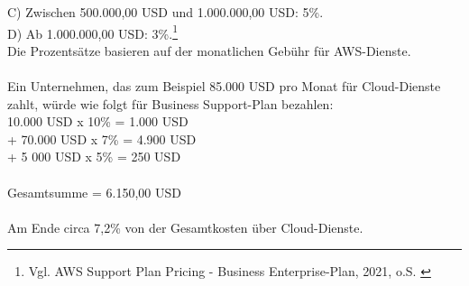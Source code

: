 C) Zwischen 500.000,00 USD und 1.000.000,00 USD: 5\%.\\
D) Ab 1.000.000,00 USD: 3\%.\footnote{Vgl.  AWS Support Plan Pricing - Business Enterprise-Plan, 2021, o.S. \cite{AMZ38}}\\
Die Prozentsätze basieren auf der monatlichen Gebühr für AWS-Dienste.
\\\\ 
Ein Unternehmen, das zum Beispiel 85.000 USD pro Monat für Cloud-Dienste zahlt, würde wie folgt für Business Support-Plan bezahlen:\\
10.000 USD x 10\% = 1.000 USD\\
+ 70.000 USD x 7\% = 4.900 USD\\
+ 5 000 USD x 5\% = 250 USD\\\\
Gesamtsumme = 6.150,00 USD
\\\\
Am Ende circa 7,2\% von der Gesamtkosten über Cloud-Dienste.

